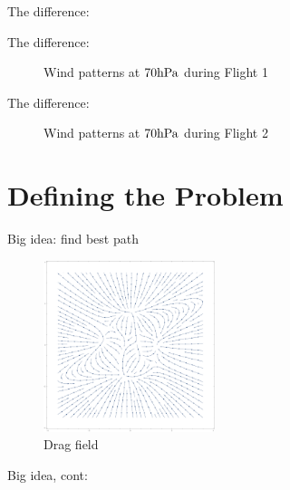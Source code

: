 \documentclass{fkpresentation}
\begin{document}
\begin{frame}{The difference:}
  \vfill
\end{frame}

\begin{frame}{The difference:}
  \vfill
  \begin{figure}[h]
    \centering
    \caption{Wind patterns at $70\mathrm{hPa}$ during Flight 1}
  \end{figure}
  \vfill
\end{frame}

\begin{frame}{The difference:}
  \vfill
  \begin{figure}[h]
    \centering
    \caption{Wind patterns at $70\mathrm{hPa}$ during Flight 2}
  \end{figure}
  \vfill
\end{frame}

\section{Defining the Problem}

\begin{frame}{Big idea: find best path}
  \begin{figure}[h]
    \centering
    \includegraphics[keepaspectratio,height=5cm]{figures/vector-field.pdf}
    \caption{Drag field}
    \label{fig:wind}
  \end{figure}
\end{frame}

\begin{frame}{Big idea, cont:}
  \begin{figure}[h]
    \vfill
    \centering
    \vfill
  \end{figure}
\end{frame}
\end{document}
